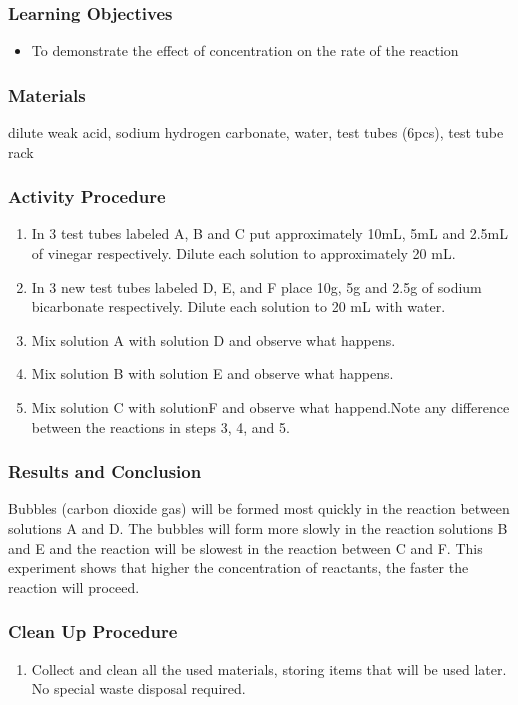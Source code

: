 \subsubsection*{Learning Objectives}
\begin{itemize}
\item{To demonstrate the effect of concentration on the rate of the reaction}
\end{itemize}

\subsubsection*{Materials}
dilute weak acid, sodium hydrogen carbonate, water, test tubes (6pcs), test tube rack

\subsubsection*{Activity Procedure}
\begin{enumerate}
\item{In 3 test tubes labeled A, B and C put approximately 10mL, 5mL and 2.5mL of vinegar respectively. Dilute each solution to approximately 20 mL.}
\item{In 3 new test tubes labeled D, E, and F place 10g, 5g and 2.5g of sodium bicarbonate respectively. Dilute each solution to 20 mL with water.}
\item{Mix solution A with solution D and observe what happens.}
\item{Mix solution B with solution E and observe what happens.}
\item{Mix solution C with solutionF and observe what happend.Note any difference between the reactions in steps 3, 4, and 5.}
\end{enumerate}

\subsubsection*{Results and Conclusion}
Bubbles (carbon dioxide gas) will be formed most quickly in the reaction between solutions A and D. The bubbles will form more slowly in the reaction solutions B and E and the reaction will be slowest in the reaction between C and F. 
This experiment shows that higher the concentration of reactants, the faster the reaction will proceed.

\subsubsection*{Clean Up Procedure}
\begin{enumerate}
\item{Collect and clean all the used materials, storing items that will be used later. No special waste disposal required.}
\end{enumerate}

